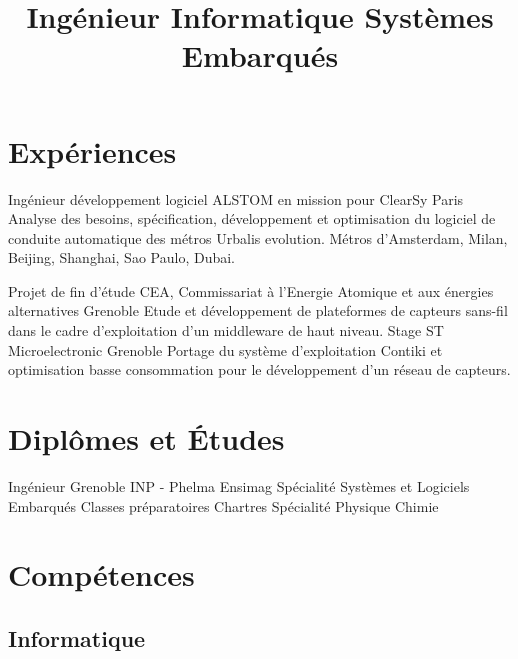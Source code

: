 \documentclass[10pt,a4paper]{moderncv}
\title{\large Ingénieur Informatique Systèmes Embarqués}
\begin{document}
\maketitle

\section{Expériences}

	{Ingénieur développement logiciel}
	{ALSTOM en mission pour ClearSy}
	{}
	{Paris}
	{Analyse des besoins, spécification, développement et optimisation du logiciel de conduite automatique des métros Urbalis evolution.\newline{} Métros d'Amsterdam, Milan, Beijing, Shanghai, Sao Paulo, Dubai.\newline{}}

	{Projet de fin d'étude}
	{CEA, Commissariat à l'Energie Atomique et aux énergies alternatives}
	{}
	{Grenoble}
	{Etude et développement de plateformes de capteurs sans-fil dans le cadre d'exploitation d'un middleware de haut niveau.\newline{}}
	{Stage}
	{ST Microelectronic}
	{}
	{Grenoble}
	{Portage du système d'exploitation Contiki et optimisation basse consommation pour le développement d'un réseau de capteurs.\newline{}}

\section{Diplômes et Études}
	{Ingénieur Grenoble INP - Phelma Ensimag}
	{}
	{}
	{}
	{Spécialité Systèmes et Logiciels Embarqués\newline{}}
	{Classes préparatoires}
	{}
	{}
	{Chartres}
	{Spécialité Physique Chimie\newline{}}

\section{Compétences}

	\subsection{Informatique}
\end{document}
